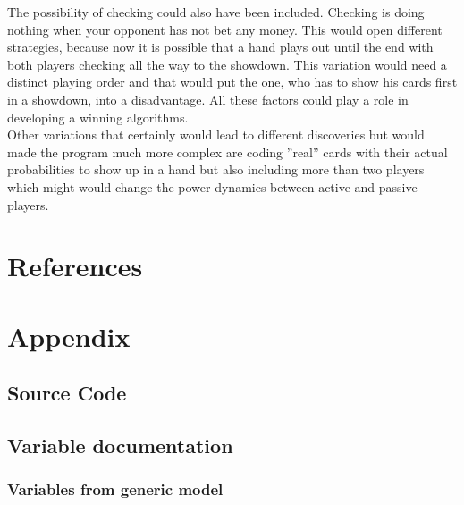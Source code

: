 \documentclass[11pt]{article}
\begin{document}
The possibility of checking could also have been included. Checking is doing nothing when your opponent has not bet any money. This would open different strategies, because now it is possible that a hand plays out until the end with both players checking all the way to the showdown. This variation would need a distinct playing order and that would put the one, who has to show his cards first in a showdown, into a disadvantage. All these factors could play a role in developing a winning algorithms.\\

Other variations that certainly would lead to different discoveries but would made the program much more complex are coding ''real'' cards with their actual probabilities to show up in a hand but also including more than two players which might would change the power dynamics between active and passive players.


\section{References}

\section{Appendix}
\subsection{Source Code}
\subsection{Variable documentation}
\subsubsection{Variables from generic model}
\end{document}
